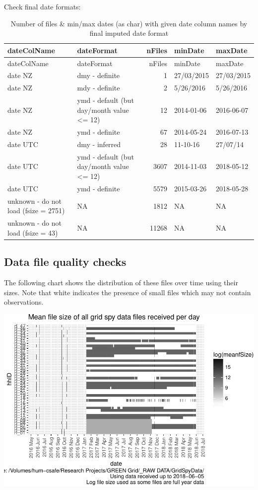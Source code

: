\documentclass[]{article}
\begin{document}
Check final date formats:

\begin{longtable}[]{@{}llrll@{}}
\caption{Number of files \& min/max dates (as char) with given date
column names by final imputed date format}\tabularnewline
\toprule
dateColName & dateFormat & nFiles & minDate & maxDate\tabularnewline
\midrule
\endfirsthead
\toprule
dateColName & dateFormat & nFiles & minDate & maxDate\tabularnewline
\midrule
\endhead
date NZ & dmy - definite & 1 & 27/03/2015 & 27/03/2015\tabularnewline
date NZ & mdy - definite & 2 & 5/26/2016 & 5/26/2016\tabularnewline
date NZ & ymd - default (but day/month value \textless{}= 12) & 12 &
2014-01-06 & 2016-06-07\tabularnewline
date NZ & ymd - definite & 67 & 2014-05-24 & 2016-07-13\tabularnewline
date UTC & dmy - inferred & 28 & 11-10-16 & 27/07/14\tabularnewline
date UTC & ymd - default (but day/month value \textless{}= 12) & 3607 &
2014-11-03 & 2018-05-12\tabularnewline
date UTC & ymd - definite & 5579 & 2015-03-26 &
2018-05-28\tabularnewline
unknown - do not load (fsize = 2751) & NA & 1812 & NA &
NA\tabularnewline
unknown - do not load (fsize = 43) & NA & 11268 & NA & NA\tabularnewline
\bottomrule
\end{longtable}

\subsection{Data file quality checks}\label{data-file-quality-checks}

The following chart shows the distribution of these files over time
using their sizes. Note that white indicates the presence of small files
which may not contain observations.

\includegraphics{processGridSpy1minData_files/figure-latex/allFileSizesPlot-1.pdf}
\end{document}

